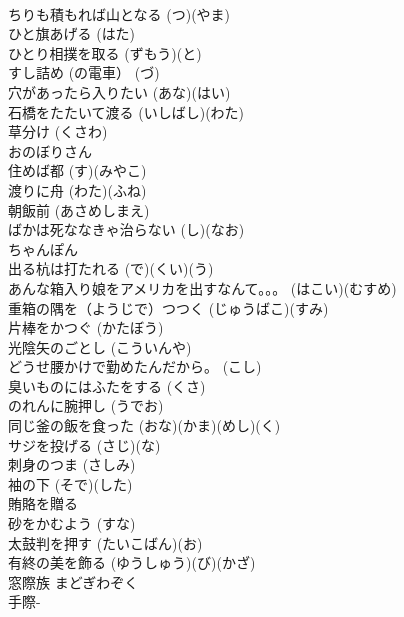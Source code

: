 \documentclass[8pt]{extreport}
\begin{document}
\begin{CJK}{UTF8}{min}
\\	ちりも積もれば山となる		(つ)(やま)	
\\	ひと旗あげる		(はた)	
\\	ひとり相撲を取る		(ずもう)(と)	
\\	すし詰め (の電車）		(づ)	
\\	穴があったら入りたい		(あな)(はい)	
\\	石橋をたたいて渡る		(いしばし)(わた)	
\\	草分け		(くさわ)	
\\	おのぼりさん			
\\	住めば都		(す)(みやこ)	
\\	渡りに舟		(わた)(ふね)	
\\	朝飯前		(あさめしまえ)	
\\	ばかは死ななきゃ治らない		(し)(なお)	
\\	ちゃんぽん			
\\	出る杭は打たれる		(で)(くい)(う)	
\\	あんな箱入り娘をアメリカを出すなんて。。。		(はこい)(むすめ)	
\\	重箱の隅を（ようじで）つつく		(じゅうばこ)(すみ)	
\\	片棒をかつぐ		(かたぼう)	
\\	光陰矢のごとし		(こういんや)	
\\	どうせ腰かけで勤めたんだから。		(こし)	
\\	臭いものにはふたをする		(くさ)	
\\	のれんに腕押し		(うでお)	
\\	同じ釜の飯を食った		(おな)(かま)(めし)(く)	
\\	サジを投げる		(さじ)(な)	
\\	刺身のつま		(さしみ)	
\\	袖の下		(そで)(した)	
\\	賄賂を贈る		
\\	砂をかむよう		(すな)	
\\	太鼓判を押す		(たいこばん)(お)	
\\	有終の美を飾る		(ゆうしゅう)(び)(かざ)	
\\	窓際族		まどぎわぞく	
\\	手際-
\end{CJK}
\end{document}
